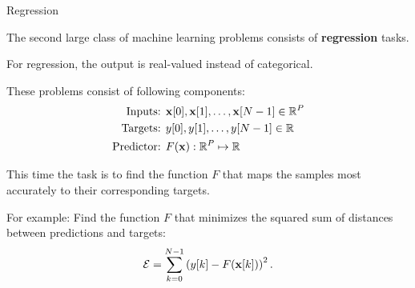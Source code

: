 \documentclass[10pt, aspectratio=169]{beamer} %
\newcommand{\R}{{\mathbb{R}}}
\newcommand{\x}{{\bf x}}
\begin{document}
\begin{frame}{Regression}
\begin{itemize}
{\small
\item The second large class of machine learning problems consists of \textbf{regression} tasks.
\item For regression, the output is real-valued instead of categorical.
\item These problems consist of following components:
\begin{align*}
\text{Inputs: } & \x[0],\x[1],\ldots,\x[N-1] \in \R^P\\
\text{Targets: } & y[0],y[1],\ldots,y[N-1] \in \R\\
\text{Predictor: } & F(\x): \R^P \mapsto \R
\end{align*}
\item This time the task is to find the function $F$ that maps the samples most 
accurately to their corresponding targets.
\item For example: Find the function $F$ that minimizes the squared
sum of distances between predictions and targets:
\[
{\cal E} = \sum_{k = 0}^{N-1} \left( y[k] - F(\x[k]) \right)^2.
\]
}
\end{itemize}
\end{frame}
\end{document}

